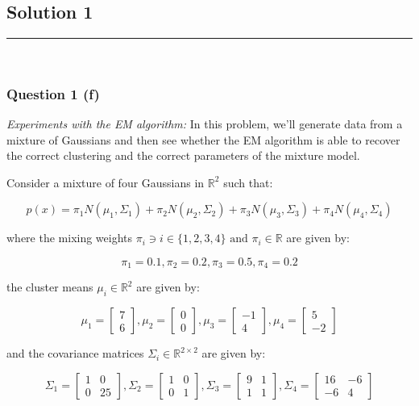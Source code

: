 \documentclass{article}
\begin{document}
\newpage

\subsection*{Solution 1}
\noindent\rule{\textwidth}{0.4pt}\\
\subsubsection*{Question 1 (f)}
\begin{flushleft}
\textit{Experiments with the EM algorithm:} In this problem, we'll generate data from a mixture of Gaussians and then see whether the EM algorithm is able to recover the correct clustering and the correct parameters of the mixture model.
\end{flushleft}
\begin{flushleft}
    Consider a mixture of four Gaussians in $\mathbb{R}^2$ such that:
\end{flushleft}
$$p(x) = \pi_1 N(\mu_1, \Sigma_1) + \pi_2 N(\mu_2, \Sigma_2) + \pi_3 N(\mu_3, \Sigma_3) + \pi_4 N(\mu_4, \Sigma_4)$$
\begin{flushleft}
    where the mixing weights $\pi_i \ni i \in \{1,2,3,4\} \text{ and } \pi_i \in \mathbb{R}$ are given by:
\end{flushleft}
$$\pi_1 = 0.1, \pi_2 = 0.2, \pi_3 = 0.5, \pi_4 = 0.2$$
\begin{flushleft}
    the cluster means $\mu_i \in \mathbb{R}^2$ are given by:
\end{flushleft}
$$\mu_1 = \begin{bmatrix}7 \\ 6\end{bmatrix}, \mu_2 = \begin{bmatrix}0 \\ 0\end{bmatrix}, \mu_3 = \begin{bmatrix}-1 \\ 4\end{bmatrix}, \mu_4 = \begin{bmatrix}5 \\ -2\end{bmatrix}$$
\begin{flushleft}
    and the covariance matrices $\Sigma_i \in \mathbb{R}^{2 \times 2}$ are given by:
\end{flushleft}
$$\Sigma_1 = \begin{bmatrix}1 & 0 \\ 0 & 25\end{bmatrix}, \Sigma_2 = \begin{bmatrix}1 & 0 \\ 0 & 1\end{bmatrix}, \Sigma_3 = \begin{bmatrix}9 & 1 \\ 1 & 1\end{bmatrix}, \Sigma_4 = \begin{bmatrix}16 & -6 \\ -6 & 4\end{bmatrix}$$
\end{document}
